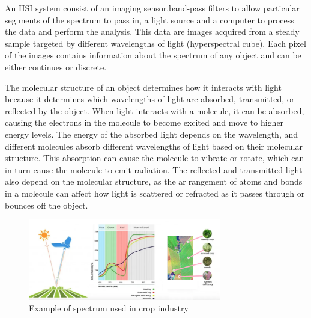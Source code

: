 \documentclass{article}
\begin{document}
{                An HSI system consist of an imaging sensor,band-pass filters to allow particular segments of the spectrum to pass in, a light source and a computer to process the data and perform the analysis. This data are images acquired from a steady sample targeted by different wavelengths of light (hyperspectral cube). Each pixel of the images contains information about the spectrum of any object and can be either continues or discrete.\par
                The molecular structure of an object determines how it interacts with light because it determines which wavelengths of light are absorbed, transmitted, or reflected by the object. When light interacts with a molecule, it can be absorbed, causing the electrons in the molecule to become excited and move to higher energy levels. The energy of the absorbed light depends on the wavelength, and different molecules absorb different wavelengths of light based on their molecular structure. This absorption can cause the molecule to vibrate or rotate, which can in turn cause the molecule to emit radiation. The reflected and transmitted light also depend on the molecular structure, as the arrangement of atoms and bonds in a molecule can affect how light is scattered or refracted as it passes through or bounces off the object.\par
                \vspace*{2\baselineskip}
                
                \begin{figure}[htb]
                    \centering
                    \includegraphics[width=0.75\textwidth]{Figures/spectrumPlant.PNG}
                    \caption{Example of spectrum used in crop industry}
                    \label{fig:example}
                \end{figure}
                
                \vspace*{2\baselineskip}
                
}
\end{document}
